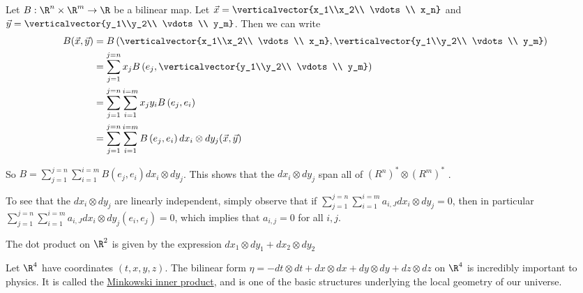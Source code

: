 \documentclass{ximera}
\begin{document}
\begin{free-response}
  Let $B:\R^n \times \R^m \to \R$ be a bilinear map.  Let $\vec{x} = \verticalvector{x_1\\x_2\\ \vdots \\ x_n}$ and 
  $\vec{y} = \verticalvector{y_1\\y_2\\ \vdots \\ y_m}$. Then we can write
  \begin{align*}
    B(\vec{x},\vec{y})&=
    B\left( \verticalvector{x_1\\x_2\\ \vdots \\ x_n}, \verticalvector{y_1\\y_2\\ \vdots \\ y_m}\right) \\
    &= \sum_{j=1}^{j=n} x_jB\left( e_j, \verticalvector{y_1\\y_2\\ \vdots \\ y_m}\right)\\
    &= \sum_{j=1}^{j=n} \sum_{i=1}^{i=m} x_jy_i B\left( e_j , e_i\right)\\
    &= \sum_{j=1}^{j=n} \sum_{i=1}^{i=m} B\left( e_j,e_i\right) dx_i \otimes dy_j(\vec{x},\vec{y})
  \end{align*}
  
  So $B = \sum_{j=1}^{j=n} \sum_{i=1}^{i=m} B\left( e_j,e_i\right) dx_i \otimes dy_j$.  This shows that the $dx_i \otimes dy_j$ span all of 
  $\left(R^n\right)^* \otimes \left(R^m\right)^*$ .
  
  To see that the $dx_i \otimes dy_j$ are linearly independent, simply observe that if 
  $\sum_{j=1}^{j=n} \sum_{i=1}^{i=m} a_{i,J} dx_i \otimes dy_j = 0$, then in particular
  $\sum_{j=1}^{j=n} \sum_{i=1}^{i=m} a_{i,J} dx_i \otimes dy_j (e_i,e_j)= 0$, which implies that
  $a_{i,j} = 0$ for all $i,j$.
\end{free-response}

\begin{example}
  The dot product on $\R^2$ is given by the expression $dx_1 \otimes dy_1 + dx_2 \otimes dy_2$
\end{example}

\begin{example}
  Let $\R^4$ have coordinates $(t,x,y,z)$.  The bilinear form $\eta = -dt \otimes dt +dx \otimes dx + dy\otimes dy + dz \otimes dz $ on $\R^4$ is incredibly important to physics.  
  It is called the \href{http://en.wikipedia.org/wiki/Minkowski_space}{Minkowski inner product}, and is one of the basic structures underlying the local geometry of our 
  universe.
\end{example}


	
	
	
	
	
\end{document}
